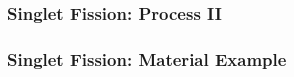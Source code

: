 \documentclass[compress]{beamer}
\begin{document}
\begin{frame}
\frametitle{Singlet Fission: Process II}
%

\end{frame}


\begin{frame}
  \frametitle{Singlet Fission: Material Example}
%
%
%
%
%

\end{frame}
\end{document}
